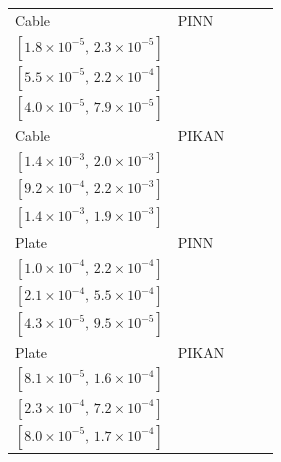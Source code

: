 \begin{tabular}{llccc}
Cable & PINN & \makecell{$\mathbf{2.0{\times}10^{-5}}$\\$[1.8{\times}10^{-5},\,2.3{\times}10^{-5}]$} & \makecell{$1.1{\times}10^{-4}$\\$[5.5{\times}10^{-5},\,2.2{\times}10^{-4}]$} & \makecell{$5.6{\times}10^{-5}$\\$[4.0{\times}10^{-5},\,7.9{\times}10^{-5}]$}\\
Cable & PIKAN & \makecell{$1.7{\times}10^{-3}$\\$[1.4{\times}10^{-3},\,2.0{\times}10^{-3}]$} & \makecell{$1.4{\times}10^{-3}$\\$[9.2{\times}10^{-4},\,2.2{\times}10^{-3}]$} & \makecell{$1.6{\times}10^{-3}$\\$[1.4{\times}10^{-3},\,1.9{\times}10^{-3}]$}\\
Plate & PINN & \makecell{$1.5{\times}10^{-4}$\\$[1.0{\times}10^{-4},\,2.2{\times}10^{-4}]$} & \makecell{$3.4{\times}10^{-4}$\\$[2.1{\times}10^{-4},\,5.5{\times}10^{-4}]$} & \makecell{$\mathbf{6.4{\times}10^{-5}}$\\$[4.3{\times}10^{-5},\,9.5{\times}10^{-5}]$}\\
Plate & PIKAN & \makecell{$\mathbf{1.1{\times}10^{-4}}$\\$[8.1{\times}10^{-5},\,1.6{\times}10^{-4}]$} & \makecell{$4.1{\times}10^{-4}$\\$[2.3{\times}10^{-4},\,7.2{\times}10^{-4}]$} & \makecell{$1.2{\times}10^{-4}$\\$[8.0{\times}10^{-5},\,1.7{\times}10^{-4}]$}\\
\bottomrule
\end{tabular}